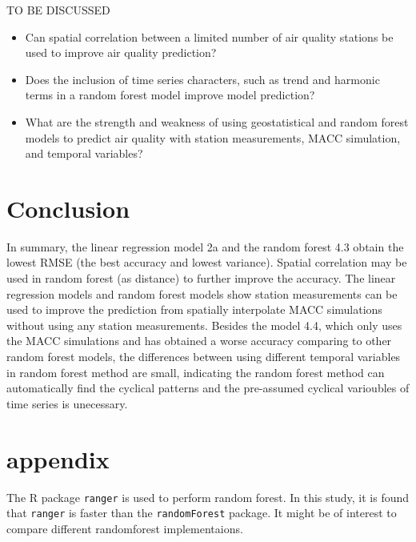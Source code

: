 \documentclass{article}
\begin{document}
TO BE DISCUSSED
\begin{itemize}
\item Can spatial correlation between a limited number of air quality stations be used to improve air quality prediction?

\item Does the inclusion of time series characters, such as trend and harmonic terms in a random forest model improve model prediction?
 
\item What are the strength and weakness of using  geostatistical and random forest models to predict air quality with station measurements, MACC simulation, and temporal variables? 
\end{itemize}


\section{Conclusion}

In summary, the linear regression model 2a and the random forest 4.3
obtain the lowest RMSE (the best accuracy and lowest
variance). Spatial correlation may be used in random forest (as
distance) to further improve the accuracy. The linear regression
models and random forest models show station measurements can be used to improve the prediction from spatially interpolate MACC simulations without using any station measurements.
Besides the model  4.4, which only uses the MACC simulations and has obtained a worse accuracy comparing to other random forest models, the differences between using different temporal variables in random forest method are small, indicating the random forest method can automatically find the cyclical patterns and the pre-assumed cyclical varioubles of time series is unecessary. 

\section *{appendix}

The R package \texttt{ranger} is used to perform random forest. In
this study, it is found that \texttt{ranger} is faster than the
\texttt{randomForest} package.  
It might be of interest to compare different randomforest
implementaions.



\end{document}
